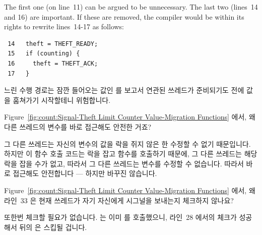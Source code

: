 \begin{enumerate}
	The first one (on line~11) can be argued to be unnecessary.
	The last two (lines~14 and 16) are important.
	If these are removed, the compiler would be within its rights
	to rewrite lines~14-17 as follows:
	\fi
	\vspace{5pt}
	\begin{minipage}[t]{\columnwidth}
	\small
	\begin{verbatim}
 14   theft = THEFT_READY;
 15   if (counting) {
 16     theft = THEFT_ACK;
 17   }
	\end{verbatim}
	\end{minipage}
	\vspace{5pt}
	느린 수행 경로는 잠깐 들어오는 값인  를 보고서 연관된
	쓰레드가 준비되기도 전에 값을 훔쳐가기 시작할테니 위험합니다.

\QuickQ{}
	Figure~\ref{fig:count:Signal-Theft Limit Counter Value-Migration
	Functions} 에서, 왜 다른 쓰레드의  변수를 바로 접근해도
	안전한 거죠?

\QuickA{}
	그 다른 쓰레드는 자신의  변수의 값을 
	락을 쥐지 않은 한 수정할 수 없기 때문입니다.
	하지만 이 함수 호출 코드는 락을 잡고 함수를 호출하기 때문에, 그 다른
	쓰레드는 해당 락을 잡을 수가 없고, 따라서 그 다른 쓰레드는
	 변수를 수정할 수 없습니다.
	따라서 바로 접근해도 안전합니다 --- 하지만 바꾸진 않습니다.

\QuickQ{}
	Figure~\ref{fig:count:Signal-Theft Limit Counter Value-Migration
	Functions} 에서, 왜 라인~33 은 현재 쓰레드가 자기 자신에게 시그널을
	보내는지 체크하지 않나요?

\QuickA{}
	또한번 체크할 필요가 없습니다.
	 는 이미  를 호출했으니,
	라인~28 에서의 체크가 성공해서 뒤의  은 스킵될
	겁니다.
	\iffalse


\end{enumerate}
